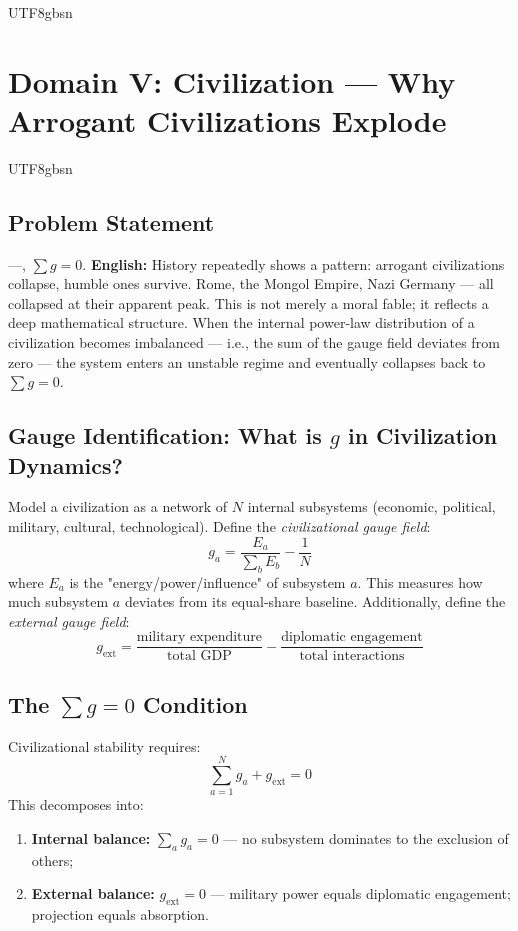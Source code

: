 \documentclass[11pt,a4paper]{article}
\begin{document}
\begin{CJK}{UTF8}{gbsn}
{\section{Domain V: Civilization --- Why Arrogant Civilizations Explode}
\label{sec:civilization}
\begin{CJK}{UTF8}{gbsn}
\subsection{Problem Statement}
\noindent
---,  $\sum g = 0$.
\vspace{0.3cm}
\noindent
\textbf{English:} History repeatedly shows a pattern: arrogant civilizations collapse,
humble ones survive. Rome, the Mongol Empire, Nazi Germany --- all collapsed at their
apparent peak. This is not merely a moral fable; it reflects a deep mathematical structure.
When the internal power-law distribution of a civilization becomes imbalanced --- i.e.,
the sum of the gauge field deviates from zero --- the system enters an unstable regime
and eventually collapses back to $\sum g = 0$.
\subsection{Gauge Identification: What is $g$ in Civilization Dynamics?}
Model a civilization as a network of $N$ internal subsystems (economic, political,
military, cultural, technological). Define the \textit{civilizational gauge field}:
\begin{equation}
    g_{a} = \frac{E_a}{\sum_b E_b} - \frac{1}{N}
\end{equation}
where $E_a$ is the "energy/power/influence" of subsystem $a$. This measures how much
subsystem $a$ deviates from its equal-share baseline.
Additionally, define the \textit{external gauge field}:
\begin{equation}
    g_{\text{ext}} = \frac{\text{military expenditure}}{\text{total GDP}} -
                     \frac{\text{diplomatic engagement}}{\text{total interactions}}
\end{equation}
\subsection{The $\sum g = 0$ Condition}
Civilizational stability requires:
\begin{equation}
    \boxed{\sum_{a=1}^N g_a + g_{\text{ext}} = 0}
\end{equation}
This decomposes into:
\begin{enumerate}[label=(\alph*)]
    \item \textbf{Internal balance:} $\sum_a g_a = 0$ --- no subsystem dominates
          to the exclusion of others;
    \item \textbf{External balance:} $g_{\text{ext}} = 0$ --- military power equals
          diplomatic engagement; projection equals absorption.
\end{enumerate}

\end{CJK}}
\end{CJK}
\end{document}
